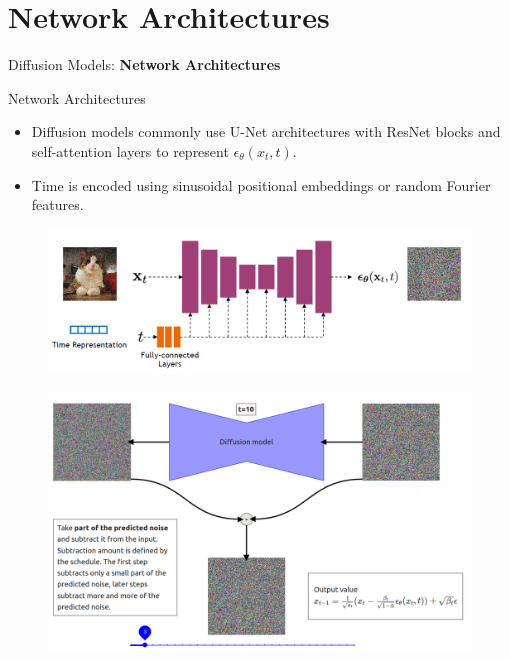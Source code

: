 \section{Network Architectures}
\begin{frame}{}
    \LARGE Diffusion Models: \textbf{Network Architectures}
\end{frame}

\begin{frame}[allowframebreaks]{Network Architectures}
\begin{itemize}
    \item Diffusion models commonly use U-Net architectures with ResNet blocks and self-attention layers to represent $\epsilon_\theta(x_t, t)$.
    \item Time is encoded using sinusoidal positional embeddings or random Fourier features.
\end{itemize}
\begin{figure}
    \centering
    \includegraphics[height=0.7\textheight, width=\textwidth, keepaspectratio]{images/diffusion/diff_7.png}
\end{figure}

\framebreak
\begin{figure}
    \centering
    \includegraphics[height=0.9\textheight, width=\textwidth, keepaspectratio]{images/diffusion/architecture-network.png}
\end{figure}


\end{frame}
